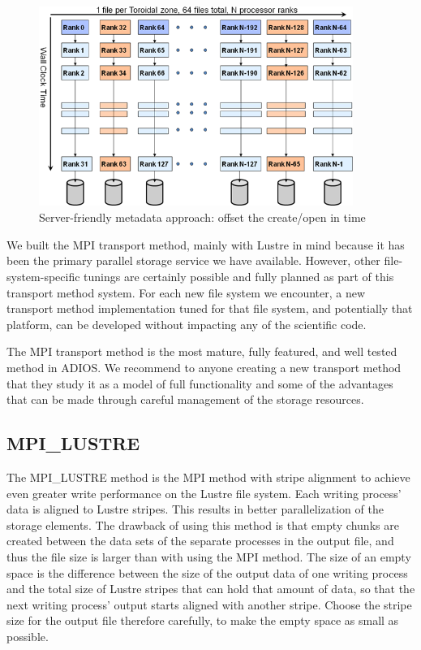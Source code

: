 \begin{figure}[htbp]
\begin{center}
\includegraphics[width=290pt, height=185pt]{figures/mpi-method-serialized-opens.png}
\caption{Server-friendly metadata approach: offset the create/open in time}
\label{fig:serialized-open}
\end{center}
\end{figure}

We built the MPI transport method, mainly with Lustre in mind because it has been 
the primary parallel storage service we have available. However, other file-system-specific 
tunings are certainly possible and fully planned as part of this transport method 
system. For each new file system we encounter, a new transport method implementation 
tuned for that file system, and potentially that platform, can be developed without 
impacting any of the scientific code.

The MPI transport method is the most mature, fully featured, and well tested method 
in ADIOS. We recommend to anyone creating a new transport method that they study 
it as a model of full functionality and some of the advantages that can be made 
through careful management of the storage resources.

\subsection{MPI\_LUSTRE}

The MPI\_LUSTRE method is the MPI method with stripe alignment to achieve even 
greater write performance on the Lustre file system. Each writing process' data 
is aligned to Lustre stripes. This results in better parallelization of the storage 
elements. The drawback of using this method is that empty chunks are created between 
the data sets of the separate processes in the output file, and thus the file size 
is larger than with using the MPI method. The size of an empty space is the difference 
between the size of the output data of one writing process and the total size of 
Lustre stripes that can hold that amount of data, so that the next writing process' 
output starts aligned with another stripe. Choose the stripe size for the output 
file therefore carefully, to make the empty space as small as possible. 

